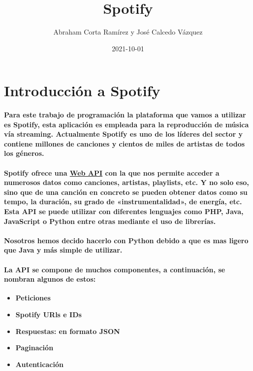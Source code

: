 \documentclass[11pt,spanish]{article}
\title{Spotify}
\date{2021-10-01}
\author{Abraham Corta Ramírez y José Calcedo Vázquez}
\begin{document}
\maketitle
\newpage
{}

\tableofcontents

\listoffigures

\clearpage

\section{Introducción a Spotify}

\paragraph*{Para este trabajo de programación la plataforma que vamos a utilizar es Spotify, esta aplicación es empleada para la reproducción de música vía streaming. Actualmente Spotify es uno de los líderes del sector y contiene millones de canciones y cientos de miles de artistas de todos los géneros.}

\paragraph*{Spotify ofrece una \href{https://developer.spotify.com/documentation/web-api/}{Web API} con la que nos permite acceder a numerosos datos como canciones, artistas, playlists, etc. Y no solo eso, sino que de una canción en concreto se pueden obtener datos como su tempo, la duración, su grado de «instrumentalidad», de energía, etc. Esta API se puede utilizar con diferentes lenguajes como PHP, Java, JavaScript o Python entre otras mediante el uso de librerías.}

\paragraph*{Nosotros hemos decido hacerlo con Python debido a que es mas ligero que Java y más simple de utilizar.}

\paragraph*{La API se compone de muchos componentes, a continuación, se nombran algunos de estos:}

\begin{itemize}
	\item \textbf{Peticiones}
	\item \textbf{Spotify URls e IDs }
	\item \textbf{Respuestas: en formato JSON}
	\item \textbf{Paginación}
	\item \textbf{Autenticación }
\end{itemize}
\end{document}
